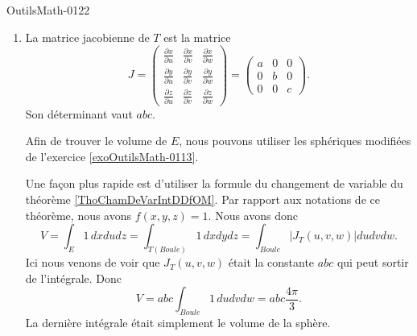 \begin{corrige}{OutilsMath-0122}
\begin{enumerate}
        \item
            La matrice jacobienne de \( T\) est la matrice
            \begin{equation}
                J=\begin{pmatrix}
                    \frac{ \partial x }{ \partial u }    &   \frac{ \partial x }{ \partial v }    &   \frac{ \partial x }{ \partial w }    \\
                    \frac{ \partial y }{ \partial u }    &   \frac{ \partial y }{ \partial v }    &   \frac{ \partial y }{ \partial w }    \\
                    \frac{ \partial z }{ \partial u }    &   \frac{ \partial z }{ \partial v }    &   \frac{ \partial z }{ \partial w }    
                \end{pmatrix}=\begin{pmatrix}
                    a    &   0    &   0    \\
                    0    &   b    &   0    \\
                    0    &   0    &   c
                \end{pmatrix}.
            \end{equation}
            Son déterminant vaut \( abc\).

            Afin de trouver le volume de \( E\), nous pouvons utiliser les sphériques modifiées de l'exercice \ref{exoOutilsMath-0113}. 

            Une façon plus rapide est d'utiliser la formule du changement de variable du théorème \ref{ThoChamDeVarIntDDfOM}. Par rapport aux notations de ce théorème, nous avons \( f(x,y,z)=1\). Nous avons donc
            \begin{equation}
                V=\int_E1\,dxdudz=\int_{T(Boule)}1\,dxdydz=\int_{Boule}| J_T(u,v,w) |dudvdw.
            \end{equation}
            Ici nous venons de voir que \( J_T(u,v,w)\) était la constante \( abc\) qui peut sortir de l'intégrale. Donc
            \begin{equation}
                V=abc\int_{Boule}1\,dudvdw=abc\frac{ 4\pi }{ 3 }.
            \end{equation}
            La dernière intégrale était simplement le volume de la sphère.

    \end{enumerate}
    

\end{corrige}
